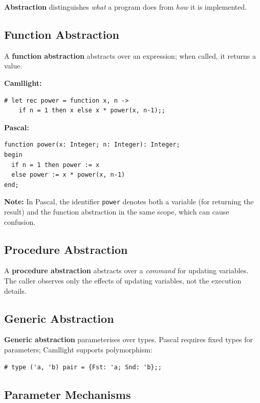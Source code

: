 \documentclass[12pt,a4paper]{article}
\begin{document}
\textbf{Abstraction} distinguishes \emph{what} a program does from \emph{how} it is
implemented.

\subsection{Function Abstraction}

A \textbf{function abstraction} abstracts over an expression; when called, it returns
a value.

\textbf{Camllight:}
\begin{lstlisting}[style=caml,numbers=none]
# let rec power = function x, n ->
    if n = 1 then x else x * power(x, n-1);;
\end{lstlisting}

\textbf{Pascal:}
\begin{lstlisting}[style=pascal,numbers=none]
function power(x: Integer; n: Integer): Integer;
begin
  if n = 1 then power := x
  else power := x * power(x, n-1)
end;
\end{lstlisting}

\textbf{Note:} In Pascal, the identifier \texttt{power} denotes both a variable
(for returning the result) and the function abstraction in the same scope,
which can cause confusion.

\subsection{Procedure Abstraction}

A \textbf{procedure abstraction} abstracts over a \emph{command} for updating variables.
The caller observes only the effects of updating variables, not the execution details.

\subsection{Generic Abstraction}

\textbf{Generic abstraction} parameterises over types.
Pascal requires fixed types for parameters; Camllight supports polymorphism:
\begin{lstlisting}[style=caml,numbers=none]
# type ('a, 'b) pair = {Fst: 'a; Snd: 'b};;
\end{lstlisting}

\subsection{Parameter Mechanisms}
\end{document}
